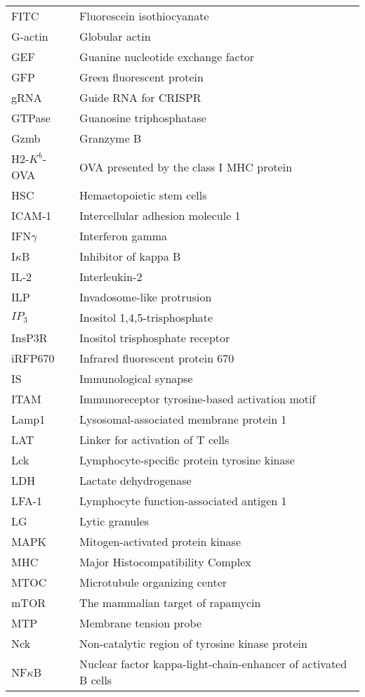 \documentclass[phd,tocprelim]{cornell}
\begin{document}
\begin{longtable}{ p{} p{} }
	FITC & Fluorescein isothiocyanate \\
	G-actin & Globular actin \\
	GEF & Guanine nucleotide exchange factor \\
	GFP & Green fluorescent protein \\
	gRNA & Guide RNA for CRISPR \\
	GTPase & Guanosine triphosphatase \\
	Gzmb & Granzyme B \\
	H2-$K^{b}$-OVA & OVA presented by the class I MHC protein \\
	HSC & Hemaetopoietic stem cells \\
	ICAM-1 & Intercellular adhesion molecule 1 \\
	IFN$\gamma$ & Interferon gamma \\
	I$\kappa$B & Inhibitor of kappa B \\
	IL-2 & Interleukin-2 \\
	ILP & Invadosome-like protrusion\\
	$IP_3$ & Inositol 1,4,5-trisphosphate \\
	InsP3R & Inositol trisphosphate receptor  \\
	iRFP670 & Infrared fluorescent protein 670 \\
	IS & Immunological synapse \\
	ITAM & Immunoreceptor tyrosine-based activation motif \\
	Lamp1 & Lysosomal-associated membrane protein 1 \\
	LAT & Linker for activation of T cells \\
	Lck & Lymphocyte-specific protein tyrosine kinase \\
	LDH	& Lactate dehydrogenase \\
	LFA-1 & Lymphocyte function-associated antigen 1 \\
	LG & Lytic granules \\
	MAPK & Mitogen-activated protein kinase \\
	MHC & Major Histocompatibility Complex \\
	MTOC & Microtubule organizing center \\
	mTOR & The mammalian target of rapamycin \\
	MTP & Membrane tension probe \\
	Nck & Non-catalytic region of tyrosine kinase protein \\
	NF$\kappa$B & Nuclear factor kappa-light-chain-enhancer of activated B cells \\

\end{longtable}
\end{document}
